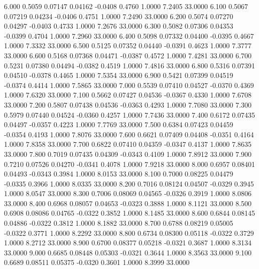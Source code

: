    6.000   0.5059   0.07147   0.04162  -0.0408   0.4760   1.0000   7.2405  33.0000
   6.100   0.5067   0.07219   0.04234  -0.0406   0.4751   1.0000   7.2490  33.0000
   6.200   0.5074   0.07270   0.04297  -0.0403   0.4733   1.0000   7.2676  33.0000
   6.300   0.5082   0.07306   0.04353  -0.0399   0.4704   1.0000   7.2960  33.0000
   6.400   0.5098   0.07332   0.04400  -0.0395   0.4667   1.0000   7.3332  33.0000
   6.500   0.5125   0.07352   0.04440  -0.0391   0.4623   1.0000   7.3777  33.0000
   6.600   0.5168   0.07368   0.04471  -0.0387   0.4572   1.0000   7.4281  33.0000
   6.700   0.5231   0.07380   0.04494  -0.0382   0.4519   1.0000   7.4816  33.0000
   6.800   0.5316   0.07391   0.04510  -0.0378   0.4465   1.0000   7.5354  33.0000
   6.900   0.5421   0.07399   0.04519  -0.0374   0.4414   1.0000   7.5865  33.0000
   7.000   0.5539   0.07410   0.04527  -0.0370   0.4369   1.0000   7.6320  33.0000
   7.100   0.5662   0.07427   0.04536  -0.0367   0.4330   1.0000   7.6708  33.0000
   7.200   0.5807   0.07438   0.04536  -0.0363   0.4293   1.0000   7.7080  33.0000
   7.300   0.5979   0.07440   0.04524  -0.0360   0.4257   1.0000   7.7436  33.0000
   7.400   0.6172   0.07435   0.04497  -0.0357   0.4223   1.0000   7.7769  33.0000
   7.500   0.6384   0.07423   0.04459  -0.0354   0.4193   1.0000   7.8076  33.0000
   7.600   0.6621   0.07409   0.04408  -0.0351   0.4164   1.0000   7.8358  33.0000
   7.700   0.6822   0.07410   0.04359  -0.0347   0.4137   1.0000   7.8635  33.0000
   7.800   0.7019   0.07435   0.04309  -0.0343   0.4109   1.0000   7.8912  33.0000
   7.900   0.7210   0.07526   0.04270  -0.0341   0.4078   1.0000   7.9218  33.0000
   8.000   0.6957   0.08401   0.04493  -0.0343   0.3984   1.0000   8.0153  33.0000
   8.100   0.7000   0.08225   0.04479  -0.0335   0.3966   1.0000   8.0335  33.0000
   8.200   0.7016   0.08124   0.04507  -0.0329   0.3945   1.0000   8.0547  33.0000
   8.300   0.7006   0.08069   0.04565  -0.0326   0.3919   1.0000   8.0806  33.0000
   8.400   0.6968   0.08057   0.04653  -0.0323   0.3888   1.0000   8.1121  33.0000
   8.500   0.6908   0.08086   0.04765  -0.0322   0.3852   1.0000   8.1485  33.0000
   8.600   0.6844   0.08145   0.04886  -0.0322   0.3812   1.0000   8.1882  33.0000
   8.700   0.6788   0.08219   0.05005  -0.0322   0.3771   1.0000   8.2292  33.0000
   8.800   0.6734   0.08300   0.05118  -0.0322   0.3729   1.0000   8.2712  33.0000
   8.900   0.6700   0.08377   0.05218  -0.0321   0.3687   1.0000   8.3134  33.0000
   9.000   0.6685   0.08448   0.05303  -0.0321   0.3644   1.0000   8.3563  33.0000
   9.100   0.6689   0.08511   0.05375  -0.0320   0.3601   1.0000   8.3999  33.0000
